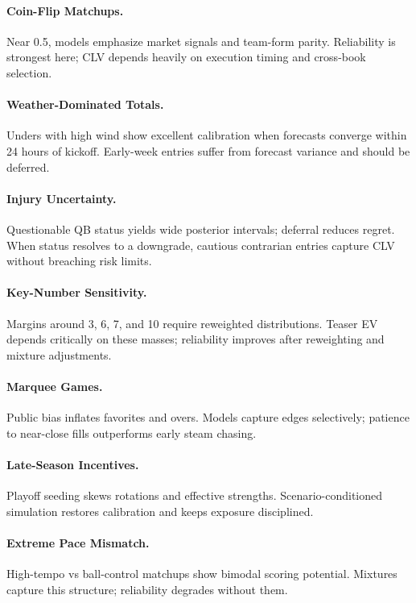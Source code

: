 \paragraph{Coin-Flip Matchups.}
Near 0.5, models emphasize market signals and team-form parity. Reliability is strongest here; CLV depends heavily on execution timing and cross-book selection.

\paragraph{Weather-Dominated Totals.}
Unders with high wind show excellent calibration when forecasts converge within 24 hours of kickoff. Early-week entries suffer from forecast variance and should be deferred.

\paragraph{Injury Uncertainty.}
Questionable QB status yields wide posterior intervals; deferral reduces regret. When status resolves to a downgrade, cautious contrarian entries capture CLV without breaching risk limits.

\paragraph{Key-Number Sensitivity.}
Margins around 3, 6, 7, and 10 require reweighted distributions. Teaser EV depends critically on these masses; reliability improves after reweighting and mixture adjustments.

\paragraph{Marquee Games.}
Public bias inflates favorites and overs. Models capture edges selectively; patience to near-close fills outperforms early steam chasing.

\paragraph{Late-Season Incentives.}
Playoff seeding skews rotations and effective strengths. Scenario-conditioned simulation restores calibration and keeps exposure disciplined.

\paragraph{Extreme Pace Mismatch.}
High-tempo vs ball-control matchups show bimodal scoring potential. Mixtures capture this structure; reliability degrades without them.

